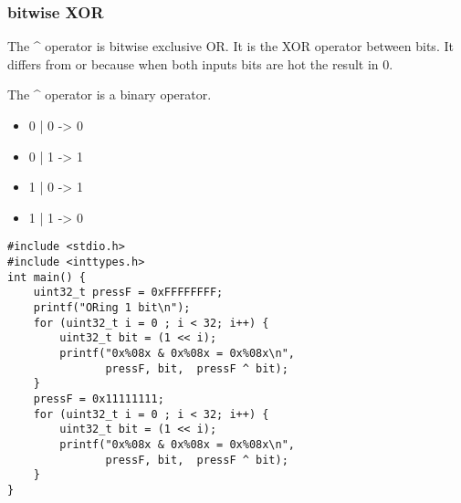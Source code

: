 \documentclass[11pt]{article}
\begin{document}
\subsubsection{bitwise XOR}
\label{sec:orgbc2f599}

The \^{} operator is bitwise exclusive OR. It is the XOR operator between
bits. It differs from or because when both inputs bits are hot the
result in 0.

The \^{} operator is a binary operator.

\begin{itemize}
\item 0 | 0 -> 0
\item 0 | 1 -> 1
\item 1 | 0 -> 1
\item 1 | 1 -> 0
\end{itemize}

\begin{verbatim}
#include <stdio.h>
#include <inttypes.h>
int main() {  
    uint32_t pressF = 0xFFFFFFFF;
    printf("ORing 1 bit\n");
    for (uint32_t i = 0 ; i < 32; i++) {
        uint32_t bit = (1 << i);
        printf("0x%08x & 0x%08x = 0x%08x\n",
               pressF, bit,  pressF ^ bit);
    }
    pressF = 0x11111111;
    for (uint32_t i = 0 ; i < 32; i++) {
        uint32_t bit = (1 << i);
        printf("0x%08x & 0x%08x = 0x%08x\n",
               pressF, bit,  pressF ^ bit);
    }
}
\end{verbatim}
\end{document}
